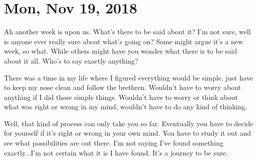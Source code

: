 \section{Mon, Nov 19, 2018}

Ah another week is upon us. What's there to be said about it? I'm not
sure, well is anyone ever really sure about what's going on? Some 
might argue it's a new week, so what. While others might have you wonder
what there is to be said about it all. Who's to say exactly anything?

There was a time in my life where I figured everything would be simple, just
have to keep my nose clean and follow the brethren. Wouldn't have to worry
about anything if I did those simple things. Wouldn't have to worry or
think about what was right or wrong in my mind, wouldn't have to do any
kind of thinking.

Well, that kind of process can only take you so far. Eventually you have
to decide for yourself if it's right or wrong in your own mind. You have
to study it out and see what possibilities are out there. I'm not saying
I've found something exactly...I'm not certain what it is I have found.
It's a journey to be sure.
